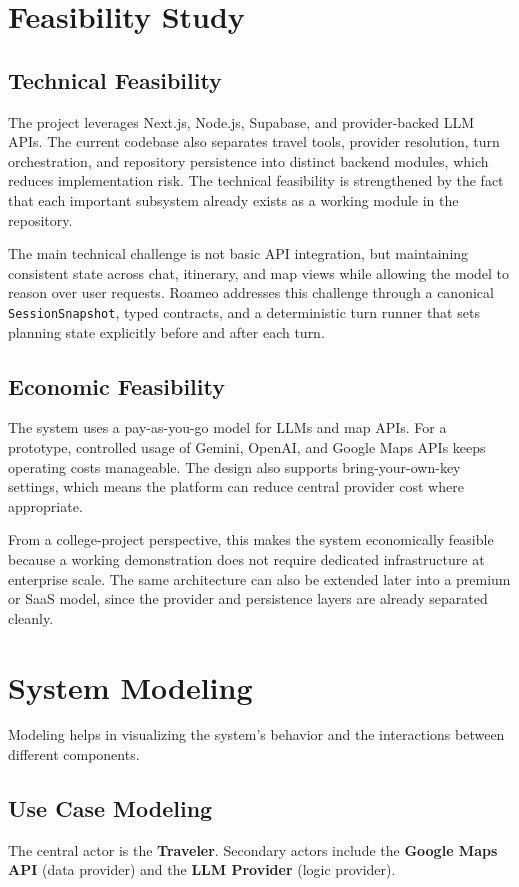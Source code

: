 \documentclass[12pt,a4paper]{report}
\begin{document}
\section{Feasibility Study}

\subsection{Technical Feasibility}
The project leverages Next.js, Node.js, Supabase, and provider-backed LLM APIs. The current codebase also separates travel tools, provider resolution, turn orchestration, and repository persistence into distinct backend modules, which reduces implementation risk. The technical feasibility is strengthened by the fact that each important subsystem already exists as a working module in the repository.

The main technical challenge is not basic API integration, but maintaining consistent state across chat, itinerary, and map views while allowing the model to reason over user requests. Roameo addresses this challenge through a canonical \texttt{SessionSnapshot}, typed contracts, and a deterministic turn runner that sets planning state explicitly before and after each turn.

\subsection{Economic Feasibility}
The system uses a pay-as-you-go model for LLMs and map APIs. For a prototype, controlled usage of Gemini, OpenAI, and Google Maps APIs keeps operating costs manageable. The design also supports bring-your-own-key settings, which means the platform can reduce central provider cost where appropriate.

From a college-project perspective, this makes the system economically feasible because a working demonstration does not require dedicated infrastructure at enterprise scale. The same architecture can also be extended later into a premium or SaaS model, since the provider and persistence layers are already separated cleanly.

\section{System Modeling}

Modeling helps in visualizing the system's behavior and the interactions between different components.

\subsection{Use Case Modeling}
The central actor is the \textbf{Traveler}. Secondary actors include the \textbf{Google Maps API} (data provider) and the \textbf{LLM Provider} (logic provider).
\end{document}
